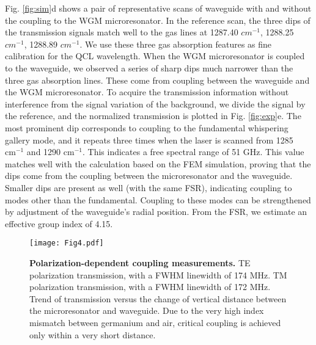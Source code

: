\documentclass[fleqn,10pt,twocolumn]{wlscirep}
\begin{document}
Fig. \ref{fig:sim}d shows a pair of representative scans of waveguide with and without the coupling to the WGM microresonator. In the reference scan, the three dips of the transmission signals match well to the  gas lines at 1287.40 $\si{cm^{-1}}$, 1288.25 $\si{cm^{-1}}$, 1288.89 $\si{cm^{-1}}$. We use these three gas absorption features as fine calibration for the QCL wavelength. When the WGM microresonator is coupled to the waveguide, we observed a series of sharp dips much narrower than the three  gas absorption lines. These come from coupling between the waveguide and the WGM microresonator. To acquire the transmission information without interference from the signal variation of the background, we divide the signal by the reference, and the normalized transmission is plotted in Fig. \ref{fig:exp}e. The most prominent dip corresponds to coupling to the fundamental whispering gallery mode, and it repeats three times when the laser is scanned from 1285 $\si{\cm^{-1}}$ and 1290 $\si{\cm^{-1}}$. This indicates a free spectral range of 51 $\si{\GHz}$. This value matches well with the calculation based on the FEM simulation, proving that the dips come from the coupling between the microresonator and the waveguide. Smaller dips are present as well (with the same FSR), indicating coupling to modes other than the fundamental. Coupling to these modes can be strengthened by adjustment of the waveguide's radial position. From the FSR, we estimate an effective group index of 4.15.

\begin{figure*}[h]
\centering\texttt{[image: Fig4.pdf]}
\caption{\label{fig:resonators}\textbf{Polarization-dependent coupling measurements.}  TE polarization transmission, with a FWHM linewidth of 174 MHz. TM polarization transmission, with a FWHM linewidth of 172 MHz.  Trend of transmission versus the change of vertical distance between the microresonator and waveguide. Due to the very high index mismatch between germanium and air, critical coupling is achieved only within a very short distance.}
\end{figure*}
\end{document}
